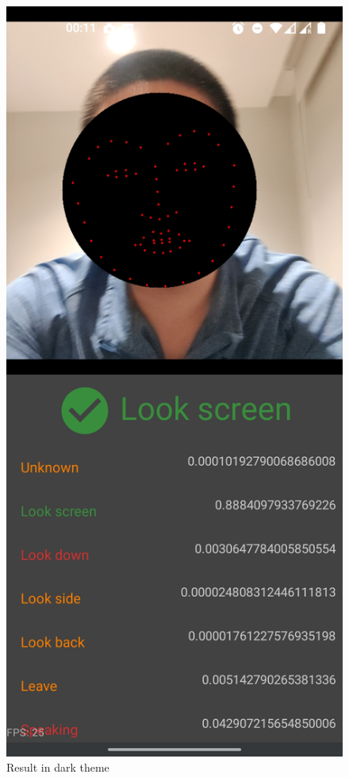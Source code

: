 \begin{minipage}{.5\textwidth}
\begin{figure}[H]
    \centering
    \includegraphics[width=\textwidth]{appendix/imgs/app-core-func0.jpg}
    \caption{Result in dark theme}
    \label{fig:app-core-func0}
\end{figure}
\end{minipage}
